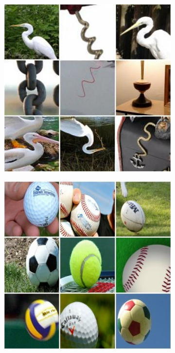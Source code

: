 \begin{figure}[!htb]
\begin{center}
\begin{subfigure}[h]{0.23\textwidth}
		\end{subfigure}
		\begin{subfigure}[h]{0.23\textwidth}
			\centering
			\includegraphics[width=1\textwidth]{"contents/images/02-feature-bird-1"}
		\end{subfigure}
		\hfill
		\begin{subfigure}[h]{0.23\textwidth}
			\centering
			\includegraphics[width=1\textwidth]{"contents/images/02-feature-ball-1"}

\end{subfigure}
\end{center}
\end{figure}
